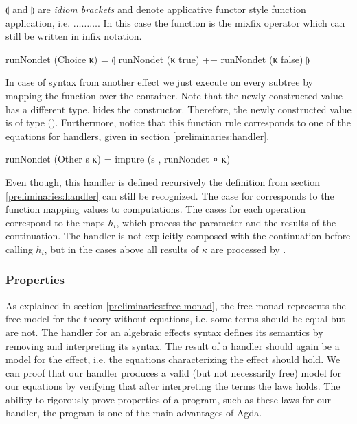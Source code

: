 \begin{AgdaAlign}
  $\llparenthesis$ and $\rrparenthesis$ are \textit{idiom brackets} and denote
  applicative functor style function application, i.e.
  \AgdaSpace{}\AgdaSpace{}\AgdaFunction{<*>}$\dots$\AgdaFunction{<*>}$\dots$\AgdaFunction{<*>}$\dots$.
  In this case the function  is the mixfix operator
  \AgdaFunction{++} which can still be written in infix notation.
  \begin{code}
runNondet (Choice κ)   = ⦇ runNondet (κ true) ++ runNondet (κ false) ⦈
  \end{code}
  In case of syntax from another effect we just execute 
  on every subtree by mapping the function over the container.
  Note that the newly constructed value has a different type.
   hides the 
  constructor.
  Therefore, the newly constructed  value is of
  type
  \AgdaSpace{}\AgdaSpace{}$($\AgdaSpace{}$)$.
  Furthermore, notice that this function rule corresponds to one of the equations
  for handlers, given in section \ref{preliminaries:handler}.
  \begin{code}
runNondet (Other s κ)  = impure (s , runNondet ∘ κ)
  \end{code}
  Even though, this handler is defined recursively the definition from section
  \ref{preliminaries:handler} can still be recognized.
  The case for  corresponds to the function
  mapping values to computations.
  The cases for each operation correspond to the maps $h_i$, which process the
  parameter and the results of the continuation.
  The handler is not explicitly composed with the continuation before calling
  $h_i$, but in the cases above all results of $\kappa$ are processed by
  .
\end{AgdaAlign}


\subsubsection{Properties}
\label{first-order:nondet:properties}

As explained in section \ref{preliminaries:free-monad}, the free monad
represents the free model for the theory without equations, i.e. some terms
should be equal but are not.
The handler for an algebraic effects syntax defines its semantics by removing
and interpreting its syntax.
The result of a handler should again be a model for the effect, i.e. the
equations characterizing the effect should hold.
We can proof that our handler produces a valid (but not necessarily free) model
for our equations by verifying that after interpreting the terms the laws holds.
The ability to rigorously prove properties of a program, such as these laws for
our handler, the program is one of the main advantages of Agda.


